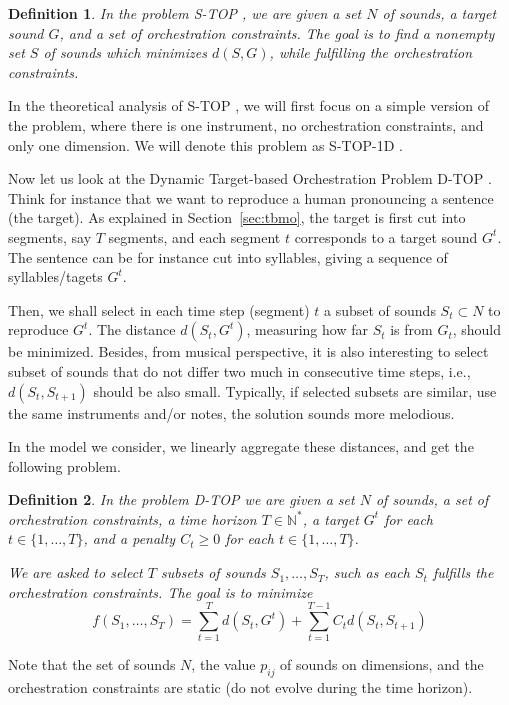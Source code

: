 \documentclass[a4paper]{book}
\newtheorem{definition}{Definition}
\newcommand{\stat}{{\sc S-TOP }}
\newcommand{\statoned}{{\sc S-TOP-1D }}
\newcommand{\dyn}{{\sc D-TOP }}
\begin{document}
\begin{definition}
In the problem \stat, we are given a set $N$ of sounds, a target sound $G$, and a set of orchestration constraints. The goal is to find a nonempty set $S$ of sounds which minimizes $d(S,G)$, while fulfilling the orchestration constraints.
\end{definition}

In the theoretical analysis of \stat, we will first focus on a simple version of the problem, where there is one instrument, no orchestration constraints, and only one dimension. We will denote this problem as \statoned.  


Now let us look at the Dynamic Target-based Orchestration Problem \dyn. Think for instance that we want to reproduce a human pronouncing a sentence (the target). As explained in Section~\ref{sec:tbmo}, the target is first cut into segments, say $T$ segments, and each segment $t$ corresponds to a target sound $G^t$. The sentence can be for instance cut into syllables, giving a sequence of syllables/tagets $G^t$. 

Then, we shall select in each time step (segment) $t$ a subset of sounds $S_t\subset N$ to reproduce $G^t$. The distance $d(S_t,G^t)$, measuring how far $S_t$ is from $G_t$, should be minimized. Besides, from musical perspective, it is also interesting to select subset of sounds that do not differ two much in consecutive time steps, i.e., $d(S_t,S_{t+1})$ should be also small. Typically, if selected subsets are similar, use the same instruments and/or notes, the solution sounds more melodious. 

In the model we consider, we linearly aggregate these distances, and get the following problem.


\begin{definition}
In the problem \dyn we are given a set $N$ of sounds, a set of orchestration constraints, a time horizon $T \in \mathbb{N}^*$, a target $G^t$ for each $t\in \{1,\dots,T\}$, and a penalty $C_t\geq 0$ for each $t\in \{1,\dots,T\}$.

We are asked to select $T$ subsets of sounds $S_{1},\dots,S_T$, such as each $S_t$ fulfills the orchestration constraints. The goal is to minimize 
$$f(S_1,\dots,S_T)=\sum_{t=1}^T d(S_t,G^t)+\sum_{t=1}^{T-1} C_t d(S_t,S_{t+1})$$

\end{definition}
Note that the set of sounds $N$, the value $p_{ij}$ of sounds on dimensions, and the orchestration constraints are static (do not evolve during the time horizon). 
\end{document}
